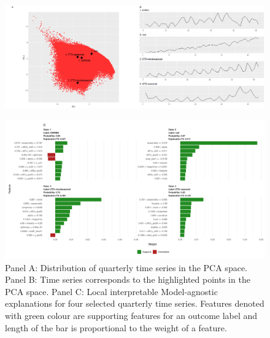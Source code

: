 \documentclass[11pt,a4paper,]{article}
\begin{document}
\begin{figure}[h]

{\centering \includegraphics{figures/quarterlylime-1} 

}

\end{figure}

\begin{figure}[h]

{\centering \includegraphics{figures/quarterlylime2-1} 

}

\caption{Panel A: Distribution of quarterly time series in the PCA space. Panel B: Time series corresponds to the highlighted points in the PCA space. Panel C: Local interpretable Model-agnostic explanations for four selected quarterly time series. Features denoted with green colour are supporting features for an outcome label and length of the bar is proportional to the weight of a feature.}\label{fig:quarterlylime2}
\end{figure}
\end{document}
